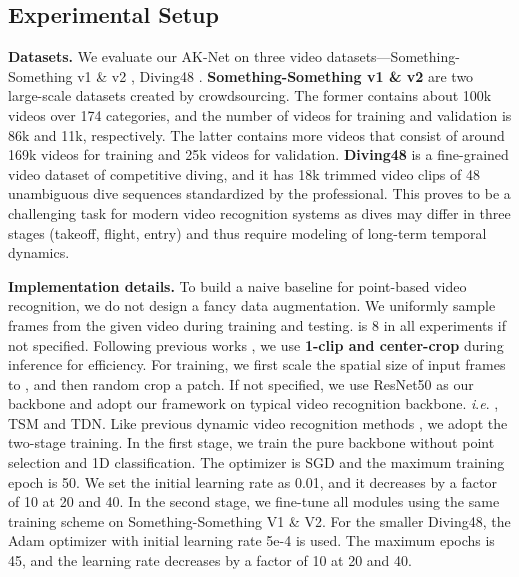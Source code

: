 \documentclass[journal]{IEEEtran}
\newcommand{\ie}{\textit{i}.\textit{e}. }
\begin{document}
\subsection{Experimental Setup}
\textbf{Datasets.}
We evaluate our AK-Net on three video datasets---Something-Something v1 \& v2 \cite{goyal2017something}, Diving48 \cite{li2018resound}.
\textbf{Something-Something v1 \& v2} are two large-scale datasets created by crowdsourcing.
The former contains about 100k videos over 174 categories, and the number of videos for training and validation is 86k and 11k, respectively.
The latter contains more videos that consist of around 169k videos for training and 25k videos for validation.
\textbf{Diving48} is a fine-grained video dataset of competitive diving, and it has 18k trimmed video clips of 48 unambiguous dive sequences standardized by the professional.
This proves to be a challenging task for modern video recognition systems as dives may differ in three stages (takeoff, flight, entry) and thus require modeling of long-term temporal dynamics.

\textbf{Implementation details.}
To build a naive baseline for point-based video recognition, we do not design a fancy data augmentation.
We uniformly sample  frames from the given video during training and testing.
 is 8 in all experiments if not specified.
Following previous works \cite{lin2019tsm, li2020tea, wang2016temporal}, we use \textbf{1-clip and center-crop} during inference for efficiency.
For training, we first scale the spatial size of input frames to , and then random crop a  patch.
If not specified, we use ResNet50 \cite{he2016deep} as our backbone and adopt our framework on typical video recognition backbone. \ie, TSM \cite{lin2019tsm} and TDN\cite{wang2021tdn}.
Like previous dynamic video recognition methods \cite{Wang_2021_AdaFocus, meng2020adafuse}, we adopt the two-stage training.
In the first stage, we train the pure backbone without point selection and 1D classification.
The optimizer is SGD and the maximum training epoch is 50.
We set the initial learning rate as 0.01, and it decreases by a factor of 10 at 20 and 40.
In the second stage, we fine-tune all modules using the same training scheme on Something-Something V1 \& V2.
For the smaller Diving48, the Adam optimizer with initial learning rate 5e-4 is used.
The maximum epochs is 45, and the learning rate decreases by a factor of 10 at 20 and 40.
\end{document}
